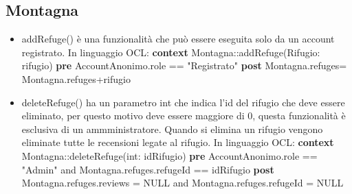\documentclass[a4paper,12pt]{article}
\begin{document}
\subsection{Montagna}
\begin{itemize}
    \item addRefuge() è una funzionalità che può essere eseguita solo da un account registrato. \newline\newline In linguaggio OCL:\newline
    \textbf{context} Montagna::addRefuge(Rifugio: rifugio)\newline
    \textbf{pre} AccountAnonimo.role == "Registrato" \newline
    \textbf{post} Montagna.refuges= Montagna.refuges+rifugio 
    \item deleteRefuge() ha un parametro int che indica l'id del rifugio che deve essere eliminato, per questo motivo deve essere maggiore di 0, questa funzionalità è esclusiva di un ammministratore. Quando si elimina un rifugio vengono eliminate tutte le recensioni legate al rifugio. \newline\newline In linguaggio OCL:\newline
    \textbf{context} Montagna::deleteRefuge(int: idRifugio)\newline
    \textbf{pre} AccountAnonimo.role == "Admin" \newline and Montagna.refuges.refugeId == idRifugio \newline
    \textbf{post} Montagna.refuges.reviews = NULL and Montagna.refuges.refugeId = NULL 
    
    
\end{itemize}
\end{document}
